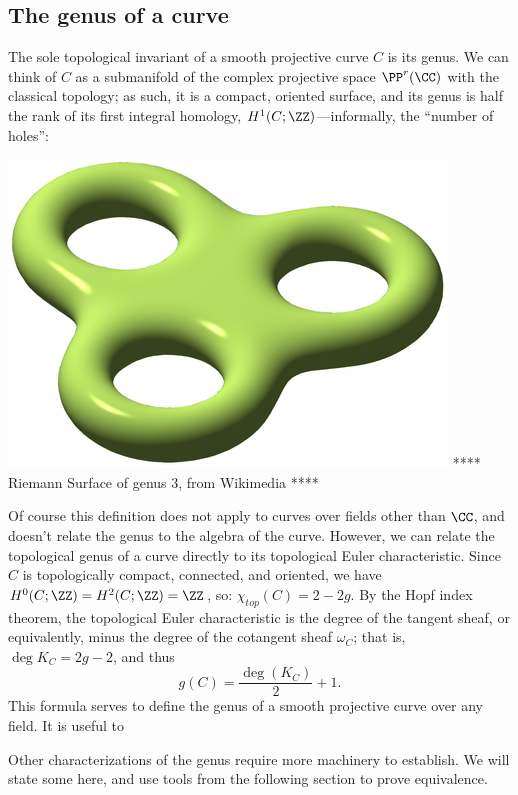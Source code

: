 \subsection{The genus of a curve}

The sole topological invariant of a smooth projective curve $C$ is its genus. We can think of $C$ as a submanifold of the complex projective space $\PP^r(\CC)$ with the classical topology; as such, it is a compact, oriented surface, and its genus is half the rank of its first integral homology, $H^{1}(C; \ZZ)$---informally, the ``number of holes'':

\includegraphics[scale = 1]{RiemannSurface}
**** Riemann Surface of genus 3, from Wikimedia ****

Of course this definition does not apply to curves over fields other than $\CC$, and doesn't relate the genus to the algebra of the curve. However, we can relate the topological genus of a curve directly to its topological Euler characteristic. Since $C$ is topologically compact, connected, and oriented, we have
$H^{0}(C; \ZZ)=H^{2}(C; \ZZ) = \ZZ$, so:
$
\chi_{top}(C) = 2-2g.
$
By the Hopf index theorem, the topological Euler characteristic is the degree of the tangent sheaf, or equivalently, minus the degree of the cotangent sheaf $\omega_{C}$; that is, $\deg K_{C} = 2g-2$, and thus
$$
g(C) = \frac{\deg(K_C)}{2} + 1.
$$
This formula serves to define the genus of a smooth projective curve over any field. It is useful to 

Other characterizations of the genus require more machinery to establish. We will state some here, and use  tools from the following section to prove equivalence.

